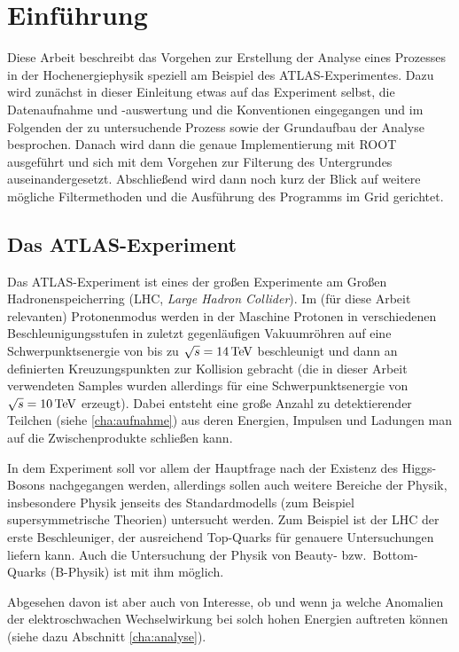 \section{Einführung}
Diese Arbeit beschreibt das Vorgehen zur Erstellung der Analyse eines Prozesses
in der Hochenergiephysik speziell am Beispiel des ATLAS-Experimentes. Dazu wird
zunächst in dieser Einleitung etwas auf das Experiment selbst, die Datenaufnahme
und -auswertung und die Konventionen eingegangen und im Folgenden der zu
untersuchende Prozess sowie der Grundaufbau der Analyse besprochen.  Danach wird
dann die genaue Implementierung mit ROOT ausgeführt und sich mit dem Vorgehen
zur Filterung des Untergrundes auseinandergesetzt. Abschließend wird dann noch
kurz der Blick auf weitere mögliche Filtermethoden und die Ausführung des
Programms im Grid gerichtet.

\subsection{Das ATLAS-Experiment}
Das ATLAS-Experiment ist eines der großen Experimente am Großen
Hadronenspeicherring (LHC, \emph{Large Hadron Collider}). Im (für diese Arbeit
relevanten) Protonenmodus werden in der Maschine Protonen in verschiedenen
Beschleunigungsstufen in zuletzt gegenläufigen Vakuumröhren auf eine
Schwerpunktsenergie von bis zu $\sqrt{s} = \unit[14]{TeV}$ beschleunigt und dann
an definierten Kreuzungspunkten zur Kollision gebracht (die in dieser Arbeit
verwendeten Samples wurden allerdings für eine Schwerpunktsenergie von $\sqrt s
= \unit[10]{TeV}$ erzeugt). Dabei entsteht eine große Anzahl zu detektierender
Teilchen (siehe \ref{cha:aufnahme}) aus deren Energien, Impulsen und Ladungen
man auf die Zwischenprodukte schließen kann.

In dem Experiment soll vor allem der Hauptfrage nach der Existenz des
Higgs-Bosons nachgegangen werden, allerdings sollen auch weitere Bereiche der
Physik, insbesondere Physik jenseits des Standardmodells (zum Beispiel
supersymmetrische Theorien) untersucht werden. Zum Beispiel ist der LHC der
erste Beschleuniger, der ausreichend Top-Quarks für genauere Untersuchungen
liefern kann. Auch die Untersuchung der Physik von Beauty- bzw.\ Bottom-Quarks
(B-Physik) ist mit ihm möglich.

Abgesehen davon ist aber auch von Interesse, ob und wenn ja welche Anomalien der
elektroschwachen Wechselwirkung bei solch hohen Energien auftreten können (siehe
dazu Abschnitt \ref{cha:analyse}).

